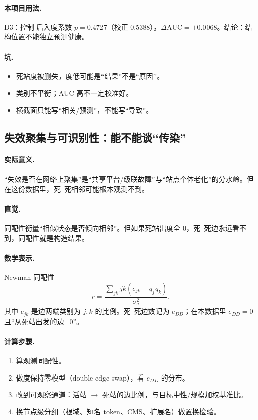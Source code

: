 \paragraph{本项目用法.}
\unit{D3}：控制  后入度系数 \(p=0.4727\)（校正 0.5388），\(\Delta\mathrm{AUC}=+0.0068\)。结论：结构位置不能独立预测健康。

\paragraph{坑.}
\begin{itemize}
  \item 死站度被删失，度低可能是“结果”不是“原因”。
  \item 类别不平衡；AUC 高不一定校准好。
  \item 横截面只能写“相关/预测”，不能写“导致”。
\end{itemize}

\subsection{失效聚集与可识别性：能不能谈“传染”}

\paragraph{实际意义.}
“失效是否在网络上聚集”是“共享平台/级联故障”与“站点个体老化”的分水岭。但在这份数据里，死--死相邻可能根本观测不到。

\paragraph{直觉.}
同配性衡量“相似状态是否倾向相邻”。但如果死站出度全 0，死--死边永远看不到，同配性就是构造结果。

\paragraph{数学表示.}
Newman 同配性
\[
r=\frac{\sum_{jk}jk(e_{jk}-q_jq_k)}{\sigma_q^2},
\]
其中 \(e_{jk}\) 是边两端类别为 \(j,k\) 的比例。死--死边数记为 \(e_{DD}\)；在本数据里 \(e_{DD}=0\) 且“从死站出发的边=0”。

\paragraph{计算步骤.}
\begin{enumerate}
  \item 算观测同配性。
  \item 做度保持零模型（double edge swap），看 \(e_{DD}\) 的分布。
  \item 改到可观察通道：活站 \(\to\) 死站的边比例，与目标中性/规模加权基准比。
  \item 换节点级分组（根域、短名 token、CMS、扩展名）做置换检验。
\end{enumerate}

